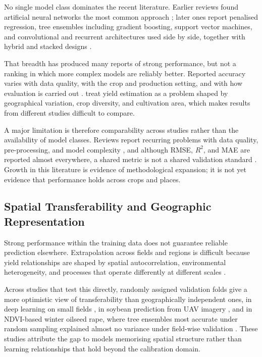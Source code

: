 \documentclass[ASNA,twocolumn]{USG}
\begin{document}
No single model class dominates the recent literature. Earlier reviews found artificial neural
networks the most common approach \cite{vanKlompenburg2020}; later ones report
penalised regression, tree ensembles including gradient boosting, support vector machines,
and convolutional and recurrent architectures used side by side, together with hybrid and
stacked designs \cite{Jabed2024,Screpnik2025,Shawon2025,Sharma2023}.

That breadth has produced many reports of strong performance, but not a ranking in which
more complex models are reliably better. Reported accuracy varies with data quality, with
the crop and production setting, and with how evaluation is carried out
\cite{Screpnik2025,Shawon2025}. \citet{Jabed2024} treat yield estimation as a
problem shaped by geographical variation, crop diversity, and cultivation area, which makes
results from different studies difficult to compare.

A major limitation is therefore comparability across studies rather than the availability of
model classes. Reviews report
recurring problems with data quality, pre-processing, and model complexity
\cite{Jabed2024,Screpnik2025}, and although RMSE, $R^2$, and MAE are reported almost
everywhere, a shared metric is not a shared validation standard
\cite{Screpnik2025,Shawon2025}. Growth in this literature is evidence of methodological
expansion; it is not yet evidence that performance holds across crops and places.

\subsection{Spatial Transferability and Geographic Representation}

Strong performance within the training data does not guarantee reliable prediction
elsewhere. Extrapolation across fields and regions is difficult because yield relationships
are shaped by spatial autocorrelation, environmental heterogeneity, and processes that
operate differently at different scales \cite{Habibi2024,Stiller2024}.

Across studies that test this directly, randomly assigned validation folds give a more
optimistic view of transferability than geographically independent ones, in deep learning on
small fields \cite{Stiller2024}, in soybean prediction from UAV imagery
\cite{Habibi2024}, and in NDVI-based winter oilseed rape, where tree ensembles most
accurate under random sampling explained almost no variance under field-wise validation
\cite{Okupska2026}. These studies attribute the gap to models memorising spatial structure rather than learning
relationships that hold beyond the calibration domain.
\end{document}
